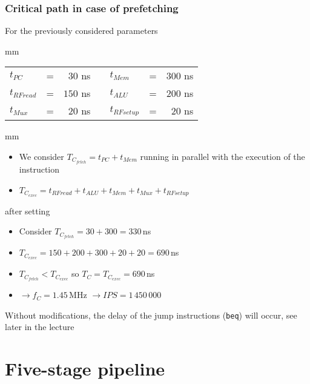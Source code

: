 \documentclass{beamer}
\begin{document}
\begin{frame}
\frametitle{Critical path in case of prefetching}

For the previously considered parameters

 mm

\begin{tabular}{l c r m{1 cm} l c r}
$t_{PC}$ & = & $30$ ns & & $t_{Mem}$ & = & $300$ ns \\
$t_{RFread}$ & = & $150$ ns  & & $t_{ALU}$ & = & $200$ ns \\
$t_{Mux}$ & = & $20$ ns  & & $t_{RFsetup}$ & = & $20$ ns \\
\end{tabular}

 mm

\begin{itemize}
 \item We consider $T_{C_{fetch}} = t_{PC} + t_{Mem}$ running in parallel with the execution of the instruction
 \item $T_{C_{exec}} = t_{RFread} + t_{ALU} + t_{Mem} + t_{Mux} + t_{RFsetup}$
\end{itemize}

after setting

\begin{itemize}
 \item Consider $T_{C_{fetch}} = 30 + 300 = 330$\,ns
 \item $T_{C_{exec}} = 150 + 200 + 300 + 20 + 20 = 690$\,ns
 \item $T_{C_{fetch}} < T_{C_{exec}}$ so $T_{C} = T_{C_{exec}} = 690$\,ns
 \item $\rightarrow f_{C} = 1.45$\,MHz $\rightarrow IPS = 1\,450\,000$
\end{itemize}

Without modifications, the delay of the jump instructions (\texttt{beq}) will occur, see later in the lecture

\end{frame}

\section{Five-stage pipeline}
\end{document}
